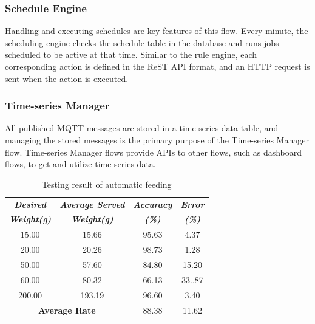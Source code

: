 \documentclass[conference]{IEEEtran}
\begin{document}
\subsubsection{Schedule Engine}
Handling and executing schedules are key features of this flow.
Every minute, the scheduling engine checks the schedule table in the database and runs jobs scheduled to be active at that time.
Similar to the rule engine, each corresponding action is defined in the ReST API format, and an HTTP request is sent when the action is executed.

\subsubsection{Time-series Manager}
All published MQTT messages are stored in a time series data table, and managing the stored messages is the primary purpose of the Time-series Manager flow.
Time-series Manager flows provide APIs to other flows, such as dashboard flows, to get and utilize time series data.

%
%
\begin{table}[htbp]
\caption{Testing result of automatic feeding}
\begin{center}
\begin{tabular}{|c|c|c|c|}
\hline
\textbf{\textit{Desired}} & \textbf{\textit{Average Served}}& \textbf{\textit{Accuracy}}& \textbf{\textit{Error}} \\
\textbf{\textit{Weight(g)}} & \textbf{\textit{Weight(g)}}& \textbf{\textit{(\%)}}& \textbf{\textit{(\%)}} \\
\hline
15.00& 15.66& 95.63 & 4.37 \\
\hline
20.00& 20.26& 98.73 & 1.28 \\
\hline
50.00& 57.60& 84.80 & 15.20 \\
\hline
60.00& 80.32& 66.13 & 33..87 \\
\hline
200.00& 193.19& 96.60 & 3.40 \\
\hline
\hline
\multicolumn{2}{|c|}{\textbf{Average Rate}}& 88.38 & 11.62 \\
\hline
\end{tabular}
\label{tab1}
\end{center}
\end{table}
\end{document}
